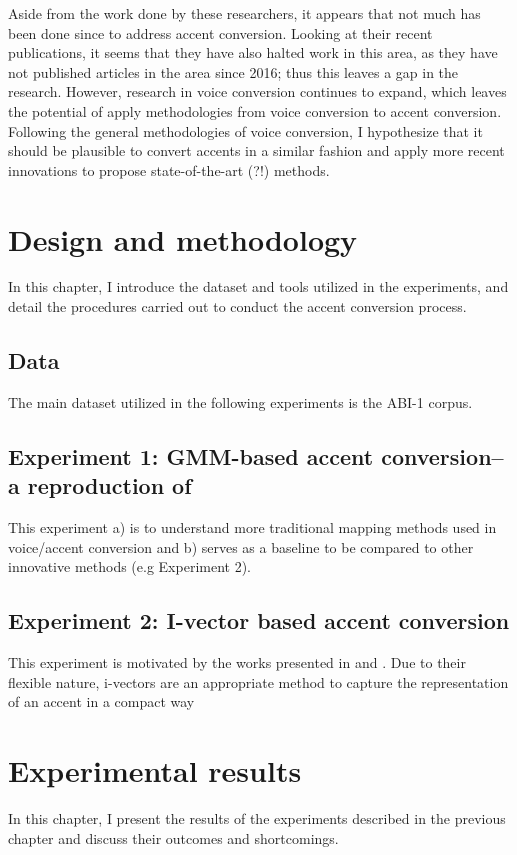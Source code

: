 \documentclass
[
    a4paper,
    twoside,
    12pt
]
{report}
\begin{document}
Aside from the work done by these researchers, it appears that not much
has been done since to address accent conversion. Looking at their
recent publications, it seems that they have also halted work in this
area, as they have not published articles in the area since 2016; thus
this leaves a gap in the research. However, research in voice conversion
continues to expand, which leaves the potential of apply methodologies
from voice conversion to accent conversion. Following the general
methodologies of voice conversion, I hypothesize that it should be
plausible to convert accents in a similar fashion and apply more recent
innovations to propose state-of-the-art (?!) methods.
\cleardoublepage
\chapter{Design and methodology}

In this chapter, I introduce the dataset and tools utilized in the
experiments, and detail the procedures carried out to conduct the accent
conversion process.

\section{Data}\label{data}

The main dataset utilized in the following experiments is the ABI-1
corpus.

\section{\texorpdfstring{Experiment 1: GMM-based accent conversion-- a
reproduction of
\textcite{aryal2014}}{Experiment 1: GMM-based accent conversion-- a reproduction of }}\label{experiment-1-gmm-based-accent-conversion-a-reproduction-of}

This experiment a) is to understand more traditional mapping methods
used in voice/accent conversion and b) serves as a baseline to be
compared to other innovative methods (e.g Experiment 2).

\section{Experiment 2: I-vector based accent
conversion}\label{experiment-2-i-vector-based-accent-conversion}

This experiment is motivated by the works presented in \textcite{wu2016}
and \textcite{kinnunen2017}. Due to their flexible nature, i-vectors are
an appropriate method to capture the representation of an accent in a
compact way
\cleardoublepage
\chapter{Experimental results}

In this chapter, I present the results of the experiments described in
the previous chapter and discuss their outcomes and shortcomings.
\cleardoublepage
% 
% 

\printbibliography
\end{document}
